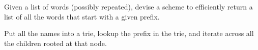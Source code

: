 \begin{blocksection}
\question Given a list of words (possibly repeated), devise a scheme to
efficiently return a list of all the words that start with a given prefix.

\begin{solution}[1in]
Put all the names into a trie, lookup the prefix in the trie, and iterate
across all the children rooted at that node.
\end{solution}
\end{blocksection}
